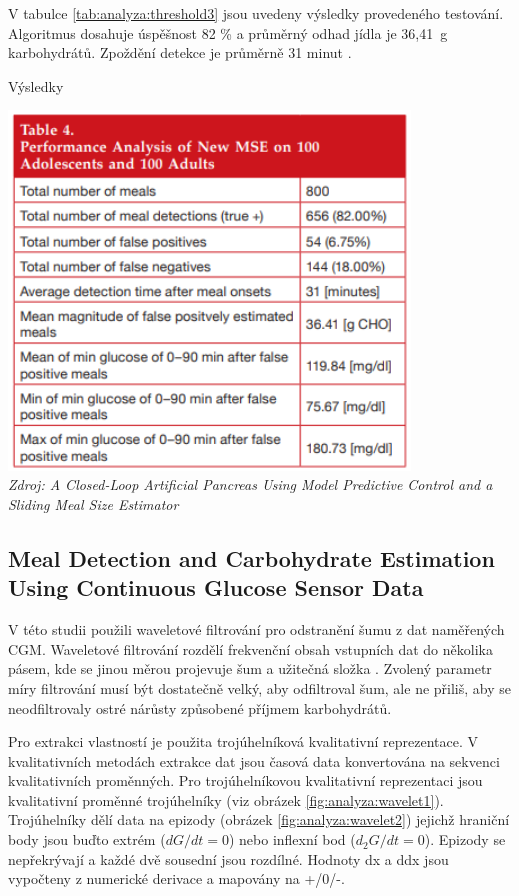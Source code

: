 V tabulce \ref{tab:analyza:threshold3} jsou uvedeny výsledky provedeného testování. Algoritmus dosahuje úspěšnost 82 \% a průměrný odhad jídla je 36,41~g karbohydrátů. Zpoždění detekce je průměrně 31 minut \citep{analyzaCHO.Thresholds}.

\begin{table}[H]
\caption{Výsledky}
\label{tab:analyza:threshold3}
\centering
\includegraphics[width=0.8\textwidth]{img/analyzaCHO/threshold3.png}\\
\textit{Zdroj: A Closed-Loop Artificial Pancreas Using Model Predictive Control and a Sliding Meal Size Estimator \citep{analyzaCHO.Thresholds}}
\end{table}


\subsection{Meal Detection and Carbohydrate Estimation Using Continuous Glucose Sensor Data}
\label{ch:analyzaCHO:wavelet}

V této studii \citet{analyzaCHO.WaveletEst} použili waveletové filtrování pro odstranění šumu z dat naměřených CGM. Waveletové filtrování rozdělí frekvenční obsah vstupních dat do několika pásem, kde se jinou měrou projevuje šum a užitečná složka \citep{analyzaCHO.Wavelet}. Zvolený parametr míry filtrování musí být dostatečně velký, aby odfiltroval šum, ale ne přiliš, aby se neodfiltrovaly ostré nárůsty způsobené příjmem karbohydrátů.

Pro extrakci vlastností je použita trojúhelníková kvalitativní reprezentace. V kvalitativních metodách extrakce dat jsou časová data konvertována na sekvenci kvalitativních proměnných. Pro trojúhelníkovou kvalitativní reprezentaci jsou kvalitativní proměnné trojúhelníky (viz obrázek \ref{fig:analyza:wavelet1}). Trojúhelníky dělí data na epizody (obrázek \ref{fig:analyza:wavelet2}) jejichž hraniční body jsou buďto extrém ($dG/dt=0$) nebo inflexní bod ($d_{2}G/dt=0$). Epizody se nepřekrývají a každé dvě sousední jsou rozdílné. Hodnoty dx a ddx jsou vypočteny z numerické derivace a mapovány na +/0/-.

